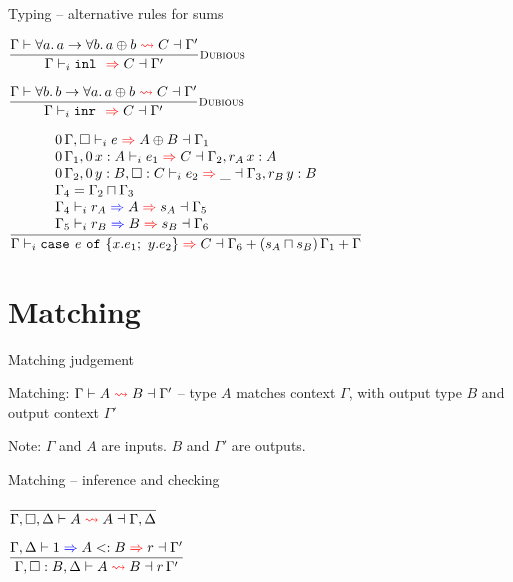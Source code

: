 \documentclass{beamer}
\begin{document}
\begin{frame}{Typing -- alternative rules for sums}

\begin{center}
  $\infrule[Dubious]{\matching{\Gamma}{\ForallI{a}{\Fun{a}{\ForallI{b}{\Sum{a}{b}}}}}{C}{\Gamma'}}{\infer{\Gamma}{\inl{}}{C}{\Gamma'}}$

  \vspace{2em}

  $\infrule[Dubious]{\matching{\Gamma}{\ForallI{b}{\Fun{b}{\ForallI{a}{\Sum{a}{b}}}}}{C}{\Gamma'}}{\infer{\Gamma}{\inr{}}{C}{\Gamma'}}$

  \vspace{2em}

  $\infrule{\begin{array}{l} \infer{\scalectx{\Zero}{\Gamma}, \emptyhint}{e}{\Sum{A}{B}}{\Gamma_1} \\  \infer{\scalectx{\Zero}{\Gamma_1}, \var[\Zero]{x}{A}}{e_1}{C}{\Gamma_2, \var[r_A]{x}{A}} \\ \infer{\scalectx{\Zero}{\Gamma_2}, \var[\Zero]{y}{B}, \typehint{C}}{e_2}{\_}{\Gamma_3, \var[r_B]{y}{B}} \\ \Gamma_4 = \glbctx{\Gamma_2}{\Gamma_3} \\ \newkinding{\Gamma_4}{r_A}{A}{s_A}{\Gamma_5} \\ \newkinding{\Gamma_5}{r_B}{B}{s_B}{\Gamma_6} \end{array}}{\infer{\Gamma}{\newcase{e}{x}{e_1}{y}{e_2}}{C}{\addctx{\Gamma_6}{\addctx{\scalectx{(\glbqty{s_A}{s_B})}{\Gamma_1}}{\Gamma}}}}$
\end{center}

\end{frame}

\section{Matching}

\begin{frame}{Matching judgement}

Matching: $\matching{\Gamma}{A}{B}{\Gamma'}$ -- type $A$ matches context $\Gamma$, with output type $B$ and output context $\Gamma'$

\vspace{2em}

Note: $\Gamma$ and $A$ are inputs. $B$ and $\Gamma'$ are outputs.
\end{frame}

\begin{frame}{Matching -- inference and checking}

\begin{center}
  $\infrule{}{\matching{\Gamma, \emptyhint, \Delta}{A}{A}{\Gamma, \Delta}}$

  \vspace{2em}

  $\infrule{\subtyping{\Gamma, \Delta}{\One}{A}{B}{r}{\Gamma'}}{\matching{\Gamma, \typehint{B}, \Delta}{A}{B}{\scalectx{r}{\Gamma'}}}$
\end{center}

\end{frame}
\end{document}
